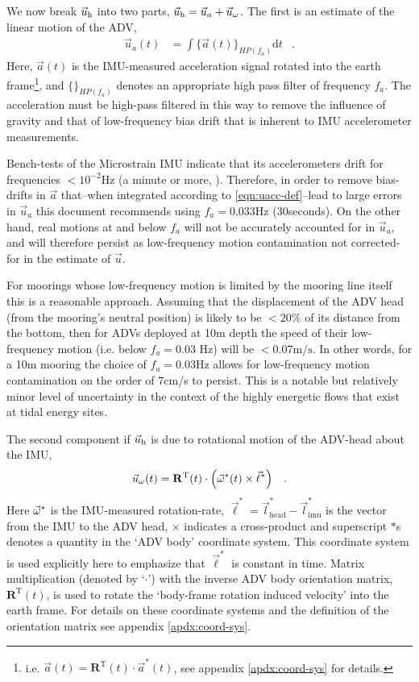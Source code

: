 \documentclass[twocol]{ametsoc}
\def\earth{}
\def\bhv{\ensuremath{\vec{l}_\mathrm{head}^*}}
\def\ihv{\ensuremath{\vec{l}^*_\mathrm{imu}}}
\def\omatinv{\ensuremath{\mathbf{R}^\mathrm{T}}}
\def\ue{\ensuremath{\vec{u}\earth}}
\def\uacc{\ensuremath{\ue_a}}
\begin{document}
We now break $\um$ into two parts, $ \um  =  \uacc + \urot $.
The first is an estimate of the linear motion of the ADV,
\begin{align}
\label{eqn:uacc-def}
  \uacc(t) & = \int \{\vec{a}\earth(t)\}_{HP(f_{a})} \mathrm{d}t & .
\end{align}
Here, $\vec{a}\earth(t)$ is the IMU-measured acceleration signal rotated into the earth frame\footnote{i.e. $\vec{a}\earth (t) = \omatinv(t) \cdot \vec{a}^*(t)$, see appendix \ref{apdx:coord-sys} for details.}, and $\{\}_{HP(f_{a})}$ denotes an appropriate high pass filter of frequency $f_a$. The acceleration must be high-pass filtered in this way to remove the influence of gravity and that of low-frequency bias drift that is inherent to IMU accelerometer measurements.  

Bench-tests of the Microstrain IMU indicate that its accelerometers drift for frequencies $<10^{-2}$Hz (a minute or more, \cite{EgelandPhD2014}).  Therefore, in order to remove bias-drifts in $\vec{a}$ that--when integrated according to \eqref{eqn:uacc-def}--lead to large errors in $\uacc$ this document recommends using $f_a = 0.033$Hz (30seconds). 
On the other hand, real motions at and below $f_a$ will not be accurately accounted for in $\uacc$, and will therefore persist as low-frequency motion contamination not corrected-for in the estimate of $\vec{u}$. 

For moorings whose low-frequency motion is limited by the mooring line itself this is a reasonable approach.  
Assuming that the displacement of the ADV head (from the mooring's neutral position) is likely to be  $< 20 \% $ of its distance from the bottom, then for ADVs deployed at 10m depth the speed of their low-frequency motion (i.e. below $ f_a = 0.03 $ Hz) will be $<0.07 \mathrm{m/s} $.  In other words, for a 10m mooring the choice of $f_a = 0.03$Hz allows for low-frequency motion contamination on the order of 7cm/s to persist.  This is a notable but relatively minor level of uncertainty in the context of the highly energetic flows that exist at tidal energy sites.

 
The second component if $\um$ is due to rotational motion of the ADV-head about the IMU,
\begin{align}
  \label{eqn:urot-def}
  \urot(t) &  = \omatinv(t) \cdot \left ( \AngRt^*(t)\times\vec{\ell}^*  \right ) & .
\end{align}
Here $\vec{\omega}^*$ is the IMU-measured rotation-rate, $\vec{\ell}^* = \bhv - \ihv$ is the vector from the IMU to the ADV head, $\times$ indicates a cross-product and superscript $*$s denotes a quantity in the `ADV body' coordinate system. This coordinate system is used explicitly here to emphasize that $\vec{\ell}^*$ is constant in time.  Matrix multiplication (denoted by `$\cdot$') with the inverse ADV body orientation matrix, $\omatinv(t)$, is used to rotate the `body-frame rotation induced velocity' into the earth frame.  For details on these coordinate systems and the definition of the orientation matrix see appendix \ref{apdx:coord-sys}.  
\end{document}
